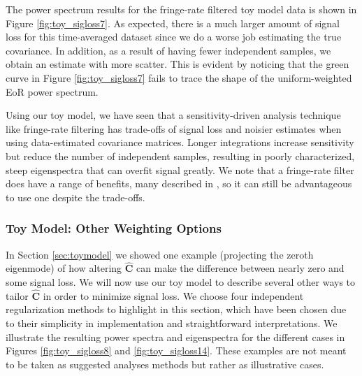\documentclass[preprint2,numberedappendix,tighten]{aastex6}  %
\begin{document}
The power spectrum results for the fringe-rate filtered toy model data is shown in Figure \ref{fig:toy_sigloss7}. As 
expected, there is a much larger amount of signal loss for this time-averaged dataset since we do a worse job estimating the true covariance. In addition, as a result of having fewer independent samples, we obtain an estimate with more scatter. This is evident by noticing that the 
green curve in Figure \ref{fig:toy_sigloss7} fails to trace the shape of the uniform-weighted EoR power spectrum.

Using our toy model, we have seen that a sensitivity-driven analysis technique like fringe-rate filtering has trade-offs of signal 
loss and noisier estimates when using data-estimated covariance matrices. Longer integrations increase sensitivity but reduce 
the number of independent samples, resulting in poorly characterized, steep eigenspectra that can overfit signal greatly. We 
note that a fringe-rate filter does have a range of benefits, many described in \citet{parsons_et_al2016}, so it can still be 
advantageous to use one despite the trade-offs.

\subsubsection{Toy Model: Other Weighting Options}
\label{sec:otherweight}

In Section \ref{sec:toymodel} we showed one example (projecting the zeroth eigenmode) of how altering $\widehat{\textbf{C}}$ can 
make the difference between nearly zero and some signal loss. We will now use our toy model to describe several other ways to tailor $\widehat{\textbf{C}}$ 
in order to minimize signal loss. We choose four independent regularization methods to highlight in this section, which have 
been chosen due to their simplicity in implementation and straightforward interpretations. We illustrate the resulting power 
spectra and eigenspectra for the different cases in Figures \ref{fig:toy_sigloss8} and \ref{fig:toy_sigloss14}. These examples are not meant to be taken as suggested analyses methods but rather as illustrative cases. 
\end{document}
